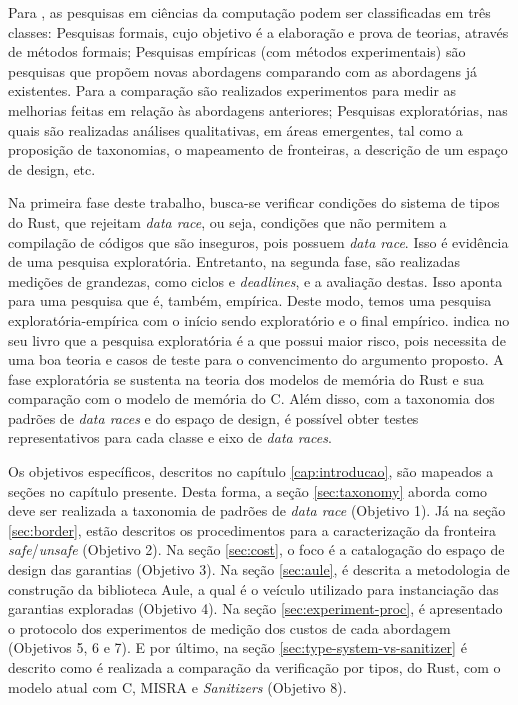 Para \citet{wazlawick2009metodologia}, as pesquisas em ciências da computação podem ser classificadas em três classes: Pesquisas formais, cujo objetivo é a elaboração e prova de teorias, através de métodos formais; Pesquisas empíricas (com métodos experimentais) são pesquisas que propõem novas abordagens comparando com as abordagens já existentes. Para a comparação são realizados experimentos para medir as melhorias feitas em relação às abordagens anteriores; Pesquisas exploratórias, nas quais são realizadas análises qualitativas, em áreas emergentes, tal como a proposição de taxonomias, o mapeamento de fronteiras, a descrição de um espaço de design, etc.

Na primeira fase deste trabalho, busca-se verificar condições do sistema de tipos do Rust, que rejeitam \textit{data race}, ou seja, condições que não permitem a compilação de códigos que são inseguros, pois possuem \textit{data race}. Isso é evidência de uma pesquisa exploratória. Entretanto, na segunda fase, são realizadas medições de grandezas, como ciclos e \textit{deadlines}, e a avaliação destas. Isso aponta para uma pesquisa que é, também, empírica. Deste modo, temos uma pesquisa exploratória-empírica com o início sendo exploratório e o final empírico. \citet{wazlawick2009metodologia} indica no seu livro que a pesquisa exploratória é a que possui maior risco, pois necessita de uma boa teoria e casos de teste para o convencimento do argumento proposto. A fase exploratória se sustenta na teoria dos modelos de memória do Rust e sua comparação com o modelo de memória do C. Além disso, com a taxonomia dos padrões de \textit{data races} e do espaço de design, é possível obter testes representativos para cada classe e eixo de \textit{data races}.

Os objetivos específicos, descritos no capítulo \ref{cap:introducao}, são mapeados a seções no capítulo presente. Desta forma, a seção \ref{sec:taxonomy} aborda como deve ser realizada a taxonomia de padrões de \textit{data race} (Objetivo 1). Já na seção \ref{sec:border}, estão descritos os procedimentos para a caracterização da fronteira \textit{safe}/\textit{unsafe} (Objetivo 2). Na seção \ref{sec:cost}, o foco é a catalogação do espaço de design das garantias (Objetivo 3). Na seção \ref{sec:aule}, é descrita a metodologia de construção da biblioteca Aule, a qual é o veículo utilizado para instanciação das garantias exploradas (Objetivo 4). Na seção \ref{sec:experiment-proc}, é apresentado o protocolo dos experimentos de medição dos custos de cada abordagem (Objetivos 5, 6 e 7). E por último, na seção \ref{sec:type-system-vs-sanitizer} é descrito como é realizada a comparação da verificação por tipos, do Rust, com o modelo atual com C, \ac{MISRA} e \textit{Sanitizers} (Objetivo 8). 


